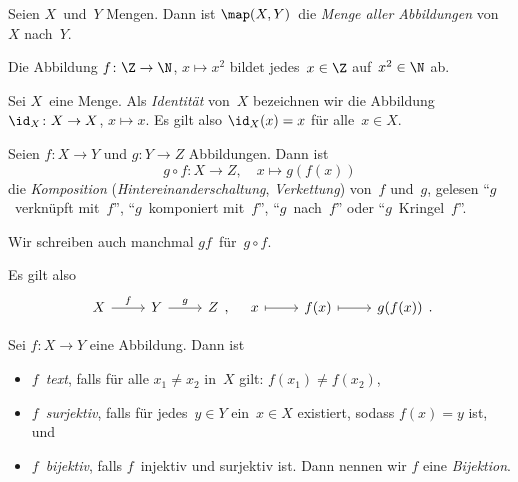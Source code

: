 \documentclass[a4paper]{article}
\begin{document}
\begin{definition}
    Seien $X$~und~$Y$ Mengen. Dann ist $\map(X, Y)$~die \emph{Menge aller Abbildungen} von~$X$ nach~$Y$.
\end{definition}

\begin{example}
    Die Abbildung $f\colon \Z \to \N$, $x \mapsto x^2$ bildet jedes~$x \in \Z$ auf~$x^2 \in \N$ ab.
\end{example}

\begin{definition}[Identität]
    Sei $X$~eine Menge. Als \emph{Identität} von~$X$ bezeichnen wir die Abbildung~$\id_X\colon X \to X$, $x \mapsto x$. Es gilt also $\id_X(x) = x$ für alle~$x \in X$.
\end{definition}

\begin{definition}
    Seien $f\colon X \to Y$ und $g\colon Y \to Z$ Abbildungen. Dann ist
    \begin{equation*}
        g \circ f\colon X \to Z,\quad x \mapsto g(f(x))
    \end{equation*}
    die \emph{Komposition} (\emph{Hintereinanderschaltung}, \emph{Verkettung}) von~$f$ und~$g$, gelesen "`$g$~verknüpft mit~$f$"', "`$g$~komponiert mit~$f$"', "`$g$~nach~$f$"' oder "`$g$~Kringel~$f$"'.
\end{definition}

\begin{notation}
    Wir schreiben auch manchmal $gf$~für~$g \circ f$.
\end{notation}

Es gilt also
\begin{equation*}
    \begin{tikzcd}
        X \ar[r, "f"] & Y \ar[r, "g"] & Z
    \end{tikzcd},
    \quad
    \begin{tikzcd}
        x \ar[r, mapsto] & f(x) \ar[r, mapsto] & g(f(x))
    \end{tikzcd}.
\end{equation*}

\begin{definition}
    Sei $f\colon X \to Y$ eine Abbildung. Dann ist
    \begin{itemize}
        \item $f$~\emph{text}, falls für alle $x_1 \neq x_2$ in~$X$ gilt: $f(x_1) \neq f(x_2)$,
        \item $f$~\emph{surjektiv}, falls für jedes~$y \in Y$ ein~$x \in X$ existiert, sodass $f(x) = y$ ist, und
        \item $f$~\emph{bijektiv}, falls $f$~injektiv und surjektiv ist. Dann nennen wir $f$ eine \emph{Bijektion}.
    \end{itemize}
\end{definition}
\end{document}
